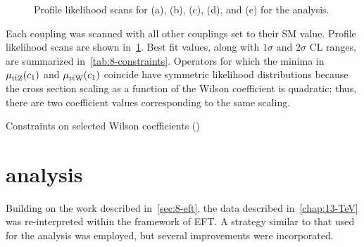 \begin{figure}[!htb]
\begin{subfigure}{0.5\textwidth}
    \caption{}
  \end{subfigure}
  \caption[Profile likelihood scans (\eightTeV)]{Profile likelihood scans for \cthreeW (a), \cHQ (b), \cpHQ (c), \cuB (d), and \cHu (e) for the \eightTeV analysis.}
  \label{fig:8-nll}
\end{figure}

Each coupling was scanned with all other couplings set to their SM value.
Profile likelihood scans are shown in~\cref{fig:8-nll}. Best fit values, along
with $1\sigma$ and $2\sigma$ CL ranges, are summarized
in~\cref{tab:8-constraints}. Operators for which the minima in $\mu_{\text{t}\bar{\text{t}}\text{Z}}(c_1)$
and $\mu_{\text{t}\bar{\text{t}}\text{W}}(c_1)$ coincide have symmetric likelihood distributions because
the cross section scaling as a function of the Wilson coefficient is quadratic;
thus, there are two coefficient values corresponding to the same scaling.

\begin{landscape}
  \begin{table}
    \centering
    \caption{Constraints on selected Wilson coefficients (\eightTeV)}
    \label{tab:8-constraints}
    
  \end{table}
\end{landscape}

\section{\thirteenTeV analysis}
\label{sec:13-eft}
Building on the work described in~\cref{sec:8-eft}, the \thirteenTeV data
described in~\cref{chap:13-TeV} was re-interpreted within the framework of EFT.
A strategy similar to that used for the \eightTeV analysis was employed, but
several improvements were incorporated.

